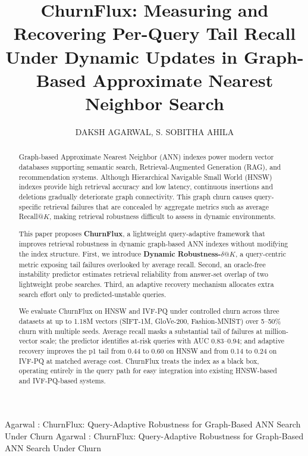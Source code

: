 \documentclass{ieeeaccess}
\begin{document}
\title{ChurnFlux: Measuring and Recovering Per-Query Tail Recall Under Dynamic Updates in Graph-Based Approximate Nearest Neighbor Search}

\author{\uppercase{Daksh Agarwal},
\uppercase{S. Sobitha Ahila}}

\address[1]{School of Computer Science and Engineering, Vellore Institute of
Technology (VIT) Chennai, Tamil Nadu, India (e-mail: daksh.agarwal2025@vitstudent.ac.in; sobithaahila.s@vit.ac.in)}

\markboth
{Agarwal \headeretal: ChurnFlux: Query-Adaptive Robustness for Graph-Based ANN Search Under Churn}
{Agarwal \headeretal: ChurnFlux: Query-Adaptive Robustness for Graph-Based ANN Search Under Churn}


\begin{abstract}
Graph-based Approximate Nearest Neighbor (ANN) indexes power modern vector databases supporting semantic search, Retrieval-Augmented Generation (RAG), and recommendation systems. Although Hierarchical Navigable Small World (HNSW) indexes provide high retrieval accuracy and low latency, continuous insertions and deletions gradually deteriorate graph connectivity. This graph churn causes query-specific retrieval failures that are concealed by aggregate metrics such as average Recall@$K$, making retrieval robustness difficult to assess in dynamic environments.

This paper proposes \textbf{ChurnFlux}, a lightweight query-adaptive framework that improves retrieval robustness in dynamic graph-based ANN indexes without modifying the index structure. First, we introduce \textbf{Dynamic Robustness-$\delta@K$}, a query-centric metric exposing tail failures overlooked by average recall. Second, an oracle-free instability predictor estimates retrieval reliability from answer-set overlap of two lightweight probe searches. Third, an adaptive recovery mechanism allocates extra search effort only to predicted-unstable queries.

We evaluate ChurnFlux on HNSW and IVF-PQ under controlled churn across three datasets at up to 1.18M vectors (SIFT-1M, GloVe-200, Fashion-MNIST) over 5--50\% churn with multiple seeds. Average recall masks a substantial tail of failures at million-vector scale; the predictor identifies at-risk queries with AUC 0.83--0.94; and adaptive recovery improves the p1 tail from 0.44 to 0.60 on HNSW and from 0.14 to 0.24 on IVF-PQ at matched average cost. ChurnFlux treats the index as a black box, operating entirely in the query path for easy integration into existing HNSW-based and IVF-PQ-based systems.
\end{abstract}
\end{document}
